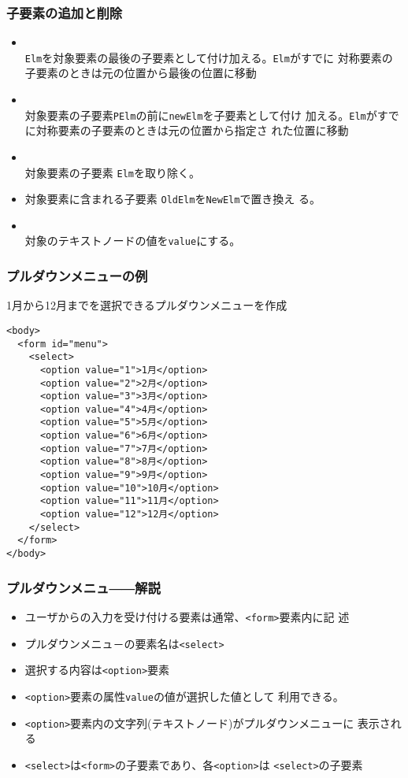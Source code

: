 \documentclass[dvipsk]{beamer}
\newcommand{\Elm}[1]{\texttt{<#1>}}
\begin{document}
\begin{frame}[containsverbatim]
 \frametitle{子要素の追加と削除}
\begin{itemize}
 \item {} \\
  \texttt{Elm}を対象要素の最後の子要素として付け加える。\texttt{Elm}がすでに
	  対称要素の子要素のときは元の位置から最後の位置に移動
 \item {} \\
   対象要素の子要素\texttt{PElm}の前に\texttt{newElm}を子要素として付け
  加える。\texttt{Elm}がすでに対称要素の子要素のときは元の位置から指定さ
	  れた位置に移動
 \item {} \\
対象要素の子要素  \texttt{Elm}を取り除く。
 \item {}
   対象要素に含まれる子要素  \texttt{OldElm}を\texttt{NewElm}で置き換え
       る。
 \item {} \\
 {対象のテキストノードの値を\texttt{value}にする。}
\end{itemize}
\end{frame}
\begin{frame}[containsverbatim]
 \frametitle{プルダウンメニューの例}
1月から12月までを選択できるプルダウンメニューを作成
{\small
\begin{verbatim}
<body>
  <form id="menu">
    <select>
      <option value="1">1月</option>
      <option value="2">2月</option>
      <option value="3">3月</option>
      <option value="4">4月</option>
      <option value="5">5月</option>
      <option value="6">6月</option>
      <option value="7">7月</option>
      <option value="8">8月</option>
      <option value="9">9月</option>
      <option value="10">10月</option>
      <option value="11">11月</option>
      <option value="12">12月</option>
    </select>
  </form>
</body>
\end{verbatim}
}
\end{frame}
\begin{frame}[containsverbatim]
 \frametitle{プルダウンメニュ――解説}
\begin{itemize}
 \item ユーザからの入力を受け付ける要素は通常、\Elm{form}要素内に記
       述
 \item プルダウンメニュ－の要素名は\Elm{select}
 \item 選択する内容は\Elm{option}要素
 \item \Elm{option}要素の属性\texttt{value}の値が選択した値として
       利用できる。
 \item \Elm{option}要素内の文字列(テキストノード)がプルダウンメニューに
       表示される
 \item \Elm{select}は\Elm{form}の子要素であり、各\Elm{option}は
       \Elm{select}の子要素
\end{itemize}
\end{frame}
\end{document}
